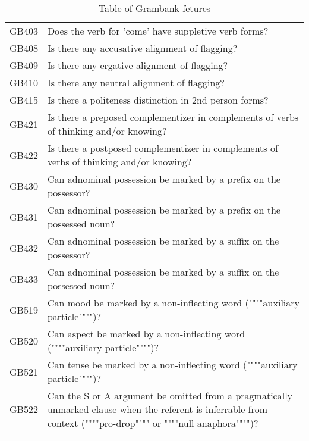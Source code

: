 \begin{longtable}{p{3cm}p{12cm}}
  GB403 & Does the verb for 'come' have suppletive verb forms? \\ 
  GB408 & Is there any accusative alignment of flagging? \\ 
  GB409 & Is there any ergative alignment of flagging? \\ 
  GB410 & Is there any neutral alignment of flagging? \\ 
  GB415 & Is there a politeness distinction in 2nd person forms? \\ 
  GB421 & Is there a preposed complementizer in complements of verbs of thinking and/or knowing? \\ 
  GB422 & Is there a postposed complementizer in complements of verbs of thinking and/or knowing? \\ 
  GB430 & Can adnominal possession be marked by a prefix on the possessor? \\ 
  GB431 & Can adnominal possession be marked by a prefix on the possessed noun? \\ 
  GB432 & Can adnominal possession be marked by a suffix on the possessor? \\ 
  GB433 & Can adnominal possession be marked by a suffix on the possessed noun? \\ 
  GB519 & Can mood be marked by a non-inflecting word (""""auxiliary particle"""")? \\ 
  GB520 & Can aspect be marked by a non-inflecting word (""""auxiliary particle"""")? \\ 
  GB521 & Can tense be marked by a non-inflecting word (""""auxiliary particle"""")? \\ 
  GB522 & Can the S or A argument be omitted from a pragmatically unmarked clause when the referent is inferrable from context (""""pro-drop"""" or """"null anaphora"""")? \\ 
   \bottomrule
\caption{Table of Grambank fetures} 
\label{GB_features_table}
\end{longtable}
